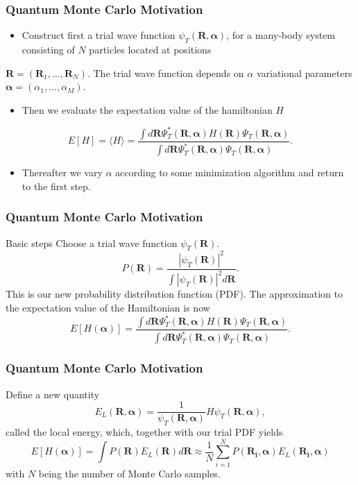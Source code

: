 \documentclass{beamer}
\begin{document}
\begin{frame}
\frametitle{Quantum Monte Carlo Motivation}

\begin{block}{}
\begin{itemize}
\item Construct first a trial wave function $\psi_T(\bm{R},\bm{\alpha})$,  for a many-body system consisting of $N$ particles located at positions 
\end{itemize}

\noindent
$\bm{R}=(\bm{R}_1,\dots ,\bm{R}_N)$. The trial wave function depends on $\alpha$ variational parameters $\bm{\alpha}=(\alpha_1,\dots ,\alpha_M)$.
\begin{itemize}
\item Then we evaluate the expectation value of the hamiltonian $H$ 
\end{itemize}

\noindent
\[
   E[H]=\langle H \rangle =
   \frac{\int d\bm{R}\Psi^{\ast}_{T}(\bm{R},\bm{\alpha})H(\bm{R})\Psi_{T}(\bm{R},\bm{\alpha})}
        {\int d\bm{R}\Psi^{\ast}_{T}(\bm{R},\bm{\alpha})\Psi_{T}(\bm{R},\bm{\alpha})}.
\]
\begin{itemize}
\item Thereafter we vary $\alpha$ according to some minimization algorithm and return to the first step.
\end{itemize}

\noindent
\end{block}
\end{frame}

\begin{frame}
\frametitle{Quantum Monte Carlo Motivation}

\begin{block}{Basic steps }
Choose a trial wave function
$\psi_T(\bm{R})$.
\[
   P(\bm{R})= \frac{\left|\psi_T(\bm{R})\right|^2}{\int \left|\psi_T(\bm{R})\right|^2d\bm{R}}.
\]
This is our new probability distribution function  (PDF).
The approximation to the expectation value of the Hamiltonian is now 
\[
   E[H(\bm{\alpha})] = 
   \frac{\int d\bm{R}\Psi^{\ast}_T(\bm{R},\bm{\alpha})H(\bm{R})\Psi_T(\bm{R},\bm{\alpha})}
        {\int d\bm{R}\Psi^{\ast}_T(\bm{R},\bm{\alpha})\Psi_T(\bm{R},\bm{\alpha})}.
\]
\end{block}
\end{frame}

\begin{frame}
\frametitle{Quantum Monte Carlo Motivation}

\begin{block}{}
Define a new quantity
\[
   E_L(\bm{R},\bm{\alpha})=\frac{1}{\psi_T(\bm{R},\bm{\alpha})}H\psi_T(\bm{R},\bm{\alpha}),
   \label{eq:locale1}
\]
called the local energy, which, together with our trial PDF yields
\[
  E[H(\bm{\alpha})]=\int P(\bm{R})E_L(\bm{R}) d\bm{R}\approx \frac{1}{N}\sum_{i=1}^NP(\bm{R_i},\bm{\alpha})E_L(\bm{R_i},\bm{\alpha})
  \label{eq:vmc1}
\]
with $N$ being the number of Monte Carlo samples.
\end{block}
\end{frame}
\end{document}
